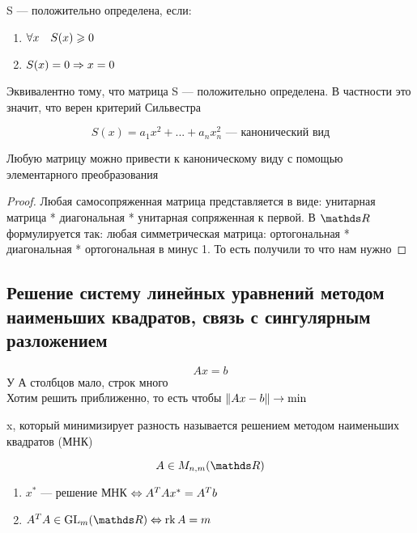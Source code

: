 \documentclass[main]{subfiles}
\begin{document}
    \begin{definition}
        S --- положительно определена, если:
        \begin{enumerate}
            \item $\forall x \quad S(x) \geqslant 0$
            \item $S(x) = 0 \Rightarrow x = 0$
        \end{enumerate}
    \end{definition}

    \begin{remark}
        Эквивалентно тому, что матрица S --- положительно определена. В частности это значит, что верен критерий Сильвестра
    \end{remark}

    \begin{Definition}
        \[S(x) = a_1 x^2 + ... + a_n x_n^2 \text{ --- канонический вид}\]
    \end{Definition}

    \begin{theorem}
        Любую матрицу можно привести к каноническому виду с помощью элементарного преобразования
    \end{theorem}

    \begin{proof}
        Любая самосопряженная матрица представляется в виде: унитарная матрица * диагональная * унитарная сопряженная к первой. В $\R$ формулируется так: любая симметрическая матрица: ортогональная * диагональная * ортогональная в минус 1. То есть получили то что нам нужно
    \end{proof}

    \subsection{Решение систему линейных уравнений методом наименьших квадратов, связь с сингулярным разложением}
    \[Ax = b\]
    У А столбцов мало, строк много\\
    Хотим решить приближенно, то есть чтобы $\lVert Ax-b \rVert \rightarrow \min$

    \begin{definition}
        x, который минимизирует разность называется решением методом наименьших квадратов (МНК)
    \end{definition}

    \begin{Theorem}
        \[A \in M_{n,m}(\R)\]
        \begin{enumerate}
            \item $x^*$ --- решение МНК $\Leftrightarrow A^T A x^* = A^T b$
            \item $A^T A \in \GL_m(\R) \lra \rk A = m$
        \end{enumerate}
    \end{Theorem}
\end{document}
